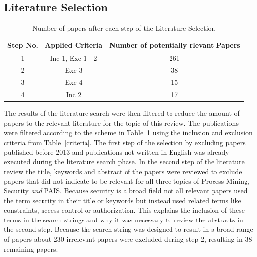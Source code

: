 \documentclass[runningheads]{llncs}
\begin{document}
\subsection{Literature Selection}\label{Selection}
\begin{table}[h!]
    \centering
    \caption{Number of papers after each step of the Literature Selection}
    \begin{tabular}{ |c|c|c|}
        \hline
        \textbf{Step No.} & \textbf{Applied Criteria} & \textbf{Number of potentially rlevant Papers} \\
        \hline
        \hline
        1                 & Inc 1, Exc 1 - 2          & 261                                           \\
        \hline
        2                 & Exc 3                     & 38                                            \\
        \hline
        3                 & Exc 4                     & 15                                            \\
        \hline
        4                 & Inc 2                     & 17                                            \\
        \hline
    \end{tabular}
    \label{selection}
\end{table}
The results of the literature search were then filtered to reduce the amount of papers to the relevant literature for the topic of this review. The publications were filtered according to the scheme in Table~\ref{selection} using the inclusion and exclusion criteria
from Table~\ref{criteria}. The first step of the selection by excluding papers published before 2013 and publications not written in English was already executed during the literature search phase.
In the second step of the literature review the title, keywords and abstract of the papers were reviewed to exclude papers that did not indicate to be relevant for all three topics of Process Mining, Security \textit{and} PAIS. Because security is a broad field not all
relevant papers used the term security in their title or keywords but instead used related terms like constraints, access control or authorization. This explains the inclusion of these terms in the search strings and why it was necessary to review the abstracts in
the second step. Because the search string was designed to result in a broad range of papers about 230 irrelevant papers were excluded during step 2, resulting in 38 remaining papers.\\
\end{document}
